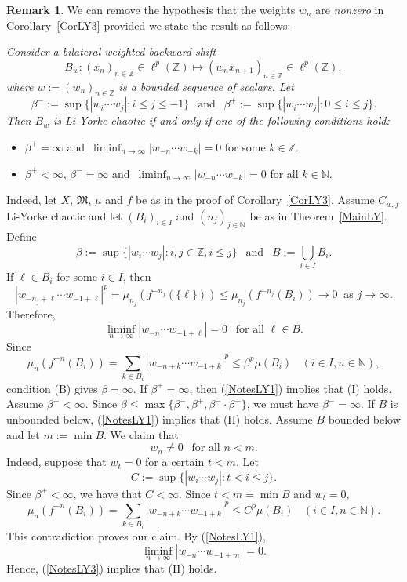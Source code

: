 \documentclass[12pt]{amsart}
\theoremstyle{theorem}
\theoremstyle{definition}
\newtheorem{remark}[theorem]{Remark}
\theoremstyle{remark} \theoremstyle{question} \theoremstyle{example}
\newcommand{\N}{\mathbb{N}}
\newcommand{\Z}{\mathbb{Z}}
\newcommand{\fM}{\mathfrak{M}}
\begin{document}
\begin{remark}\label{RemarkLY3}
We can remove the hypothesis that the weights $w_n$ are {\em nonzero} in Corollary~\ref{CorLY3} provided we state the result as follows: 
{\it Consider a bilateral weighted backward shift
\[
B_w : (x_n)_{n \in \Z} \in \ell^p(\Z) \mapsto (w_n x_{n+1})_{n \in \Z} \in \ell^p(\Z),
\]
where $w\!:= (w_n)_{n \in \Z}$ is a bounded sequence of scalars. Let
\[
\beta^-\!:= \sup\{|w_i \cdots w_j| : i \leq j \leq -1\} \ \ \text{ and } \ \ \beta^+\!:= \sup\{|w_i \cdots w_j| : 0 \leq i \leq j\}.
\]
Then $B_w$ is Li-Yorke chaotic if and only if one of the following conditions hold:
\begin{itemize}
\item [\rm (I)]  $\beta^+ = \infty$ and $\,\displaystyle \liminf_{n \to \infty} |w_{-n} \cdots w_{-k}| = 0$ for some $k \in \Z$.
\item [\rm (II)] $\beta^+ < \infty$, $\beta^- = \infty$ and $\,\displaystyle \liminf_{n \to \infty} |w_{-n} \cdots w_{-k}| = 0$ for all $k \in \N$.
\end{itemize}}

Indeed, let $X$, $\fM$, $\mu$ and $f$ be as in the proof of Corollary~\ref{CorLY3}.  
Assume $C_{w,f}$ Li-Yorke chaotic and let $(B_i)_{i \in I}$ and $(n_j)_{j \in \N}$ be as in Theorem~\ref{MainLY}.
Define
\[
\beta\!:= \sup\{|w_i \cdots w_j| : i,j \in \Z, i \leq j\} \ \ \text{ and } \ \ B\!:= \bigcup_{i \in I} B_i.
\]
If $\ell \in B_i$ for some $i \in I$, then
\[
|w_{-n_j + \ell} \cdots w_{-1 + \ell}|^p = \mu_{n_j}(f^{-n_j}(\{\ell\})) \leq \mu_{n_j}(f^{-n_j}(B_i)) \to 0 \ \text{ as } j \to \infty.
\]
Therefore,
\begin{equation}\label{NotesLY1}
\liminf_{n \to \infty} |w_{-n} \cdots w_{-1 + \ell}| = 0 \ \ \text{ for all } \ell \in B.
\end{equation}
Since 
\[
\mu_n(f^{-n}(B_i)) = \sum_{k \in B_i} |w_{-n+k} \cdots w_{-1+k}|^p \leq \beta^p \mu(B_i) \ \ \ \ (i \in I, n \in \N),
\]
condition (B) gives $\beta = \infty$. 
If $\beta^+ = \infty$, then (\ref{NotesLY1}) implies that (I) holds. Assume $\beta^+ < \infty$. 
Since $\beta \leq \max\{\beta^-, \beta^+, \beta^- \!\!\cdot\!\beta^+\}$, we must have $\beta^- = \infty$. 
If $B$ is unbounded below, (\ref{NotesLY1}) implies that (II) holds.
Assume $B$ bounded below and let $m\!:= \min B$. We claim that
\begin{equation}\label{NotesLY3}
w_n \neq 0 \ \ \text{ for all } n < m.
\end{equation}
Indeed, suppose that $w_t = 0$ for a certain $t < m$. Let
\[
C\!:= \sup\{|w_i \cdots w_j| : t < i \leq j\}.
\]
Since $\beta^+ < \infty$, we have that $C < \infty$. Since $t < m = \min B$ and $w_t = 0$,
\[
\mu_n(f^{-n}(B_i)) = \sum_{k \in B_i} |w_{-n+k} \cdots w_{-1+k}|^p \leq C^p \mu(B_i) \ \ \ \ (i \in I, n \in \N).
\]
This contradiction proves our claim. By (\ref{NotesLY1}),
\[
\liminf_{n \to \infty} |w_{-n} \cdots w_{-1 + m}| = 0.
\]
Hence, (\ref{NotesLY3}) implies that (II) holds.


\end{remark}
\end{document}
